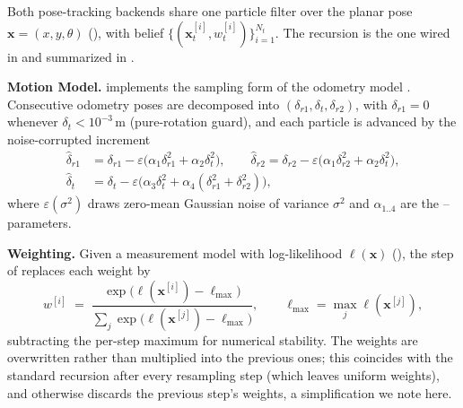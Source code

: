 Both pose-tracking backends share one particle filter over the planar pose $\mathbf{x}=(x,y,\theta)$ (), with belief $\{(\mathbf{x}^{[i]}_t,w^{[i]}_t)\}_{i=1}^{N_t}$. The recursion is the one wired in  and summarized in .

\noindent\textbf{Motion Model.}  implements the sampling form of the odometry model \citep{thrun2005probabilistic}. Consecutive odometry poses are decomposed into $(\delta_{r1},\delta_t,\delta_{r2})$, with $\delta_{r1}=0$ whenever $\delta_t<10^{-3}$\,m (pure-rotation guard), and each particle is advanced by the noise-corrupted increment
\begin{equation}\label{eq:motion}
\begin{aligned}
\hat{\delta}_{r1} &= \delta_{r1} - \varepsilon\big(\alpha_1 \delta_{r1}^2 + \alpha_2 \delta_{t}^2\big), \qquad
\hat{\delta}_{r2} = \delta_{r2} - \varepsilon\big(\alpha_1 \delta_{r2}^2 + \alpha_2 \delta_{t}^2\big),\\
\hat{\delta}_{t}  &= \delta_{t}  - \varepsilon\big(\alpha_3 \delta_{t}^2 + \alpha_4(\delta_{r1}^2 + \delta_{r2}^2)\big),
\end{aligned}
\end{equation}
where $\varepsilon(\sigma^2)$ draws zero-mean Gaussian noise of variance $\sigma^2$ and $\alpha_{1..4}$ are the -- parameters.

\noindent\textbf{Weighting.} Given a measurement model with log-likelihood $\ell(\mathbf{x})$ (), the  step of  replaces each weight by
\begin{equation}\label{eq:weights}
  w^{[i]} \;=\; \frac{\exp\!\big(\ell(\mathbf{x}^{[i]})-\ell_{\max}\big)}{\sum_{j}\exp\!\big(\ell(\mathbf{x}^{[j]})-\ell_{\max}\big)}, \qquad \ell_{\max}=\max_j \ell(\mathbf{x}^{[j]}),
\end{equation}
subtracting the per-step maximum for numerical stability. The weights are overwritten rather than multiplied into the previous ones; this coincides with the standard recursion after every resampling step (which leaves uniform weights), and otherwise discards the previous step's weights, a simplification we note here.

